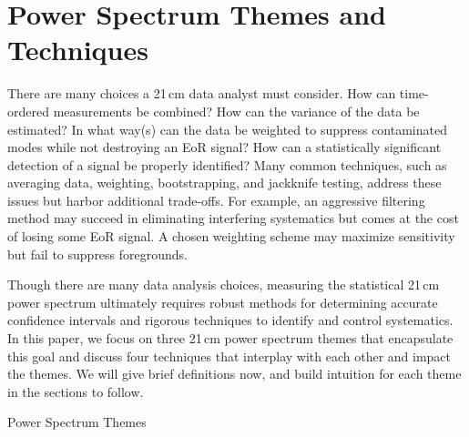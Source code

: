 \documentclass[preprint2,numberedappendix,tighten]{aastex6}  %
\begin{document}

\section{Power Spectrum Themes and Techniques}
\label{sec:Themes}

There are many choices a 21\,cm data analyst must consider. %
How can time-ordered measurements be combined? How can the 
variance of the data be estimated? In what way(s) can the data be weighted to suppress contaminated modes while not 
destroying an EoR signal? How can a statistically significant detection of a signal be properly identified? Many common techniques, such as 
averaging data, weighting, bootstrapping, and jackknife testing, address these issues but harbor additional trade-offs. For 
example, an aggressive filtering method may succeed in eliminating interfering systematics but comes at the cost of losing 
some EoR signal. A chosen weighting scheme may maximize sensitivity but fail to suppress foregrounds. 

Though there are many data analysis choices, measuring the statistical 21\,cm power spectrum ultimately requires robust 
methods for determining accurate confidence intervals and rigorous techniques to identify and control systematics.  In this 
paper, we focus on three 21\,cm power spectrum themes that encapsulate this goal and discuss four techniques that interplay 
with each other and impact the themes. We will give brief definitions now, and build intuition for each theme in the sections to 
follow.

\begin{center}
Power Spectrum Themes
\end{center}
\end{document}

